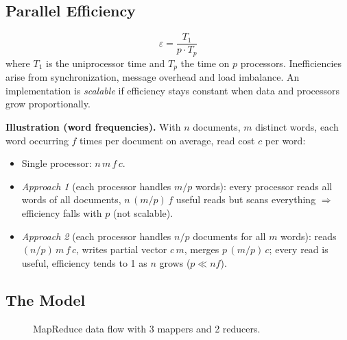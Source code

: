 \subsection{Parallel Efficiency}
\[ \varepsilon = \frac{T_{1}}{p \cdot T_{p}} \]
where $T_1$ is the uniprocessor time and $T_p$ the time on $p$ processors. Inefficiencies arise from synchronization,
message overhead and load imbalance. An implementation is \emph{scalable} if efficiency stays constant when data and processors grow
proportionally.

\textbf{Illustration (word frequencies).} With $n$ documents, $m$ distinct words, each word occurring $f$ times per document on
average, read cost $c$ per word:
\begin{itemize}[leftmargin=*]
  \item Single processor: $n\,m\,f\,c$.
  \item \emph{Approach 1} (each processor handles $m/p$ words): every processor reads all words of all documents, $n\,(m/p)\,f$ useful
        reads but scans everything $\Rightarrow$ efficiency falls with $p$ (not scalable).
  \item \emph{Approach 2} (each processor handles $n/p$ documents for all $m$ words): reads $(n/p)\,m\,f\,c$, writes partial vector
        $c\,m$, merges $p\,(m/p)\,c$; every read is useful, efficiency tends to 1 as $n$ grows ($p \ll nf$).
\end{itemize}

\subsection{The Model}
\begin{figure}[H]
\centering
{}
\caption{MapReduce data flow with 3 mappers and 2 reducers.}
\end{figure}

